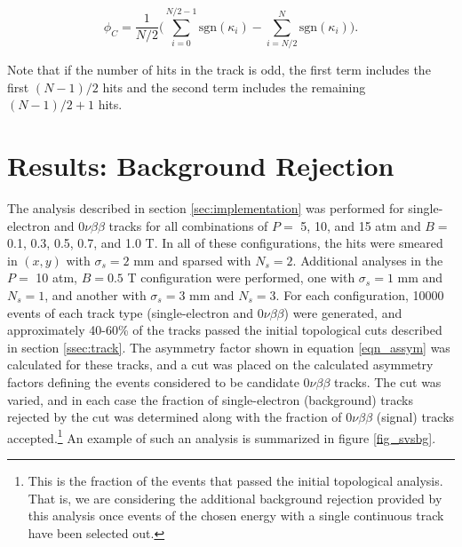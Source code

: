 \documentclass{JINST}
\begin{document}
\begin{equation}\label{eqn_assym}
\phi_{C} = \frac{1}{N/2}\Biggl(\sum_{i=0}^{N/2-1}\mathrm{sgn}(\kappa_{i}) - \sum_{i=N/2}^{N}\mathrm{sgn}(\kappa_{i})\Biggr).
\end{equation}

\noindent Note that if the number of hits in the track is odd, the first term includes the first $(N-1)/2$ hits and
the second term includes the remaining $(N-1)/2 + 1$ hits.

\section{Results: Background Rejection}
The analysis described in section \ref{sec:implementation} was performed for single-electron and
$0\nu\beta\beta$ tracks for all combinations of $P =$ 5, 10, and 15 atm and $B =$ 0.1, 0.3, 0.5, 0.7, 
and 1.0 T.  In all of these configurations, the hits were smeared in $(x,y)$ with $\sigma_{s} = 2$ mm and sparsed with 
$N_{s} = 2$.  Additional analyses in the $P =$ 10 atm, $B = 0.5$ T configuration were performed, one with 
$\sigma_{s} = 1$ mm and $N_{s} = 1$, and another with $\sigma_{s} = 3$ mm and $N_{s} = 3$.  For each configuration, 
10000 events of each track type (single-electron and $0\nu\beta\beta$) were generated, and approximately 
40-60\% of the tracks passed the initial topological cuts described in section \ref{ssec:track}.  The asymmetry factor 
shown in equation \ref{eqn_assym} was calculated for these tracks, and a cut was placed on the calculated asymmetry
factors defining the events considered to be candidate $0\nu\beta\beta$ tracks.  The cut was varied, and in each case 
the fraction of single-electron (background) tracks rejected by the cut was determined along with the fraction of 
$0\nu\beta\beta$ (signal) tracks accepted.\footnote{This is the fraction of the events that passed the initial topological
analysis.  That is, we are considering the additional background rejection provided by this analysis once events of
the chosen energy with a single continuous track have been selected out.}  An example of such an analysis is 
summarized in figure \ref{fig_svsbg}.
\end{document}
